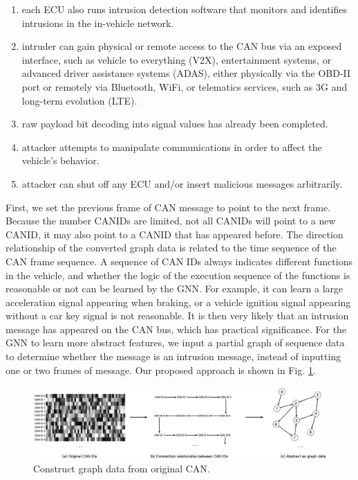 \documentclass[lettersize,journal]{IEEEtran}
\begin{document}
\begin{enumerate}
\item{each ECU also runs intrusion detection software that monitors and identifies intrusions in the in-vehicle network.}
\item{intruder can gain physical or remote access to the CAN bus via an exposed interface, such as vehicle to everything (V2X), entertainment systems, or advanced driver assistance systems (ADAS), either physically via the OBD-II port or remotely via Bluetooth, WiFi, or telematics services, such as 3G and long-term evolution (LTE).}
\item{raw payload bit decoding into signal values has already been completed.}
\item{attacker attempts to manipulate communications in order to affect the vehicle's behavior.}
\item{attacker can shut off any ECU and/or insert malicious messages arbitrarily.}
\end{enumerate}

First, we set the previous frame of CAN message to point to the next frame. Because the number CANIDs are limited, not all CANIDs will point to a new CANID, it may also point to a CANID that has appeared before. The direction relationship of the converted graph data is related to the time sequence of the CAN frame sequence. A sequence of CAN IDs always indicates different functions in the vehicle, and whether the logic of the execution sequence of the functions is reasonable or not can be learned by the GNN. For example, it can learn a large acceleration signal appearing when braking, or a vehicle ignition signal appearing without a car key signal is not reasonable. It is then very likely that an intrusion message has appeared on the CAN bus, which has practical significance. For the GNN to learn more abstract features, we input a partial graph of sequence data to determine whether the message is an intrusion message, instead of inputting one or two frames of message. Our proposed approach is shown in Fig. \ref{fig_3}.

\begin{figure}[!t]
\centering
\includegraphics[width=7in]{graph-data}
\caption{Construct graph data from original CAN.}
\label{fig_3}
\end{figure}
\end{document}
